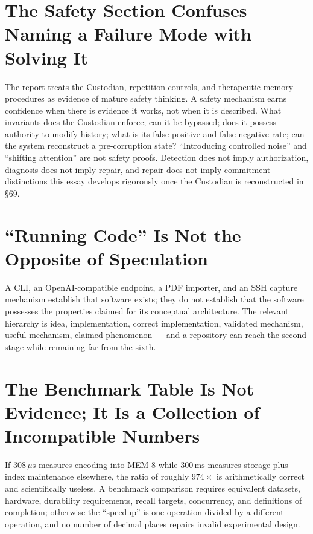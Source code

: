 \documentclass[12pt]{article}
\begin{document}
\section{The Safety Section Confuses Naming a Failure Mode with Solving It}

The report treats the Custodian, repetition controls, and therapeutic memory procedures as evidence of mature safety thinking. A safety mechanism earns confidence when there is evidence it works, not when it is described. What invariants does the Custodian enforce; can it be bypassed; does it possess authority to modify history; what is its false-positive and false-negative rate; can the system reconstruct a pre-corruption state? ``Introducing controlled noise'' and ``shifting attention'' are not safety proofs. Detection does not imply authorization, diagnosis does not imply repair, and repair does not imply commitment — distinctions this essay develops rigorously once the Custodian is reconstructed in \S69.

\section{``Running Code'' Is Not the Opposite of Speculation}

A CLI, an OpenAI-compatible endpoint, a PDF importer, and an SSH capture mechanism establish that software exists; they do not establish that the software possesses the properties claimed for its conceptual architecture. The relevant hierarchy is idea, implementation, correct implementation, validated mechanism, useful mechanism, claimed phenomenon — and a repository can reach the second stage while remaining far from the sixth.

\section{The Benchmark Table Is Not Evidence; It Is a Collection of Incompatible Numbers}

If $308\,\mu\mathrm{s}$ measures encoding into MEM-8 while $300\,\mathrm{ms}$ measures storage plus index maintenance elsewhere, the ratio of roughly $974\times$ is arithmetically correct and scientifically useless. A benchmark comparison requires equivalent datasets, hardware, durability requirements, recall targets, concurrency, and definitions of completion; otherwise the ``speedup'' is one operation divided by a different operation, and no number of decimal places repairs invalid experimental design.
\end{document}
